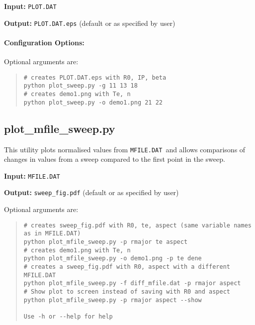 \documentclass[11pt,a4paper]{report}
\newcommand{\mfile}{\mbox{\texttt{MFILE.DAT}}}
\newcommand{\plotdat}{\mbox{\texttt{PLOT.DAT}}}
\begin{document}
\begin{description}
\item{\textbf{Input:}}
 \plotdat\
                                
\item{\textbf{Output:}}
\texttt{PLOT.DAT.eps} (default or as specified by user)
\end{description}

\paragraph{Configuration Options:}

Optional arguments are:
\begin{quote}
\begin{verbatim}
# creates PLOT.DAT.eps with R0, IP, beta
python plot_sweep.py -g 11 13 18 
# creates demo1.png with Te, n
python plot_sweep.py -o demo1.png 21 22
\end{verbatim}
\end{quote}

\subsection{plot\_mfile\_sweep.py}

This utility plots normalised values from \mfile\ and allows comparisons of
changes in values from a sweep compared to the first point in the sweep.

\begin{description}
\item{\textbf{Input:}}
 \mfile
                                
\item{\textbf{Output:}}
\texttt{sweep\_fig.pdf} (default or as specified by user)
\end{description}

Optional arguments are:
\begin{quote}
\begin{verbatim}
# creates sweep_fig.pdf with R0, te, aspect (same variable names as in MFILE.DAT)
python plot_mfile_sweep.py -p rmajor te aspect
# creates demo1.png with Te, n
python plot_mfile_sweep.py -o demo1.png -p te dene
# creates a sweep_fig.pdf with R0, aspect with a different MFILE.DAT
python plot_mfile_sweep.py -f diff_mfile.dat -p rmajor aspect
# Show plot to screen instead of saving with R0 and aspect
python plot_mfile_sweep.py -p rmajor aspect --show

Use -h or --help for help

\end{verbatim}
\end{quote}
\end{document}
